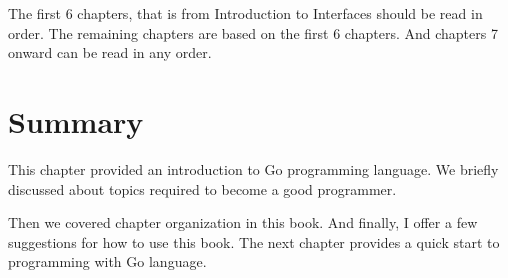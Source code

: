 The first 6 chapters, that is from Introduction to Interfaces should be read in
order. The remaining chapters are based on the first 6 chapters. And chapters 7
onward can be read in any order.

\section*{Summary}

This chapter provided an introduction to Go programming language. We briefly
discussed about topics required to become a good programmer.

Then we covered chapter organization in this book. And finally, I offer a few
suggestions for how to use this book. The next chapter provides a quick start to
programming with Go language.
